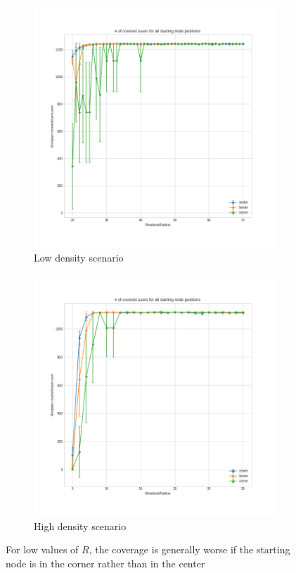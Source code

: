 \begin{figure}[hbt]
	\centering
	\begin{subfigure}[b]{0.49\textwidth}
		\centering
		\includegraphics[width=\textwidth]{img/ld/start-node-coverage}
		\caption{Low density scenario}\label{subfig:ldstartnodecoverage}
	\end{subfigure}
	\begin{subfigure}[b]{0.49\textwidth}
		\centering
		\includegraphics[width=\textwidth]{img/hd/start-node-coverage}
		\caption{High density
		scenario}\label{subfig:hdstartnodecoverage}
	\end{subfigure}
	\caption{For low values of \(R\), the coverage is generally worse if the
	starting node is in the corner rather than in the
	center}\label{fig:startnodepositioncoverage}
\end{figure}

